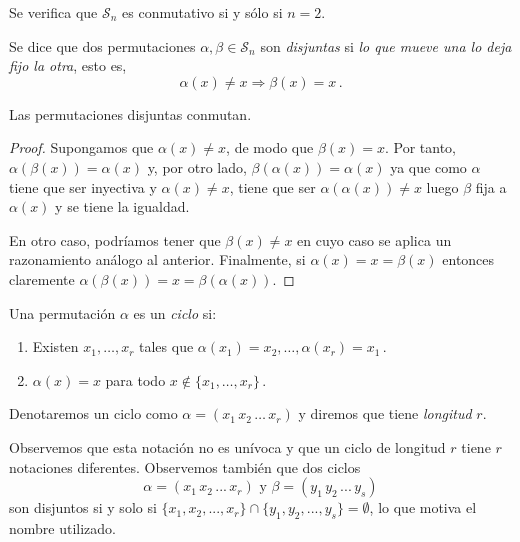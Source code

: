Se verifica que $\mathcal S_n$ es conmutativo si y sólo si $n=2$.

\begin{ndef}
Se dice que dos permutaciones $\alpha,\beta \in \mathcal S_n$ son \textit{disjuntas} si \textit{lo que mueve una lo deja fijo la otra}, esto es, \begin{equation*}
  \alpha(x) \neq x \Rightarrow \beta(x) = x\,.
\end{equation*}
\end{ndef}

\begin{nprop} 
Las permutaciones disjuntas conmutan.
\end{nprop}
\begin{proof}
Supongamos que $	\alpha(x) \neq x$, de modo que $\beta(x) = x$. Por tanto, $\alpha(\beta(x)) = \alpha(x)$ y, por otro lado, $\beta(\alpha(x)) = \alpha(x)$ ya que como $\alpha$ tiene que ser inyectiva y $\alpha(x) \neq x$, tiene que ser $\alpha(\alpha(x)) \neq x$ luego $\beta$ fija a $\alpha(x)$ y se tiene la igualdad.

En otro caso, podríamos tener que $\beta(x) \neq x$ en cuyo caso se aplica un razonamiento análogo al anterior. Finalmente, si $\alpha(x) = x = \beta(x)$ entonces claremente $\alpha(\beta(x)) = x = \beta(\alpha(x))$.
\end{proof}

\begin{ndef}[Ciclo]

Una permutación $\alpha$ es un \textit{ciclo} si: \begin{enumerate}
  \item Existen $x_1, \dots, x_r$ tales que $\alpha(x_1) = x_2, \hdots, \alpha(x_r) = x_1$\,.
  \item $\alpha(x) = x$ para todo $x \notin \{x_1,\hdots,x_r\}$\,.
\end{enumerate}

Denotaremos un ciclo como  $\alpha = (x_1 \, x_2 \, \hdots \, x_r)$ y diremos que tiene \textit{longitud} $r$.
\end{ndef}

Observemos que esta notación no es unívoca y que un ciclo de longitud $r$ tiene $r$ notaciones diferentes. Observemos también que dos ciclos \begin{equation*}
  \alpha = (x_1 \, x_2 \, ... \, x_r) \text{ y } \beta = (y_1 \, y_2 \, ... \, y_s)
\end{equation*}son disjuntos si y solo si $\{x_1, x_2, ... , x_r \} \cap \{y_1, y_2 , ... , y_s \} = \emptyset$, lo que motiva el nombre utilizado.

